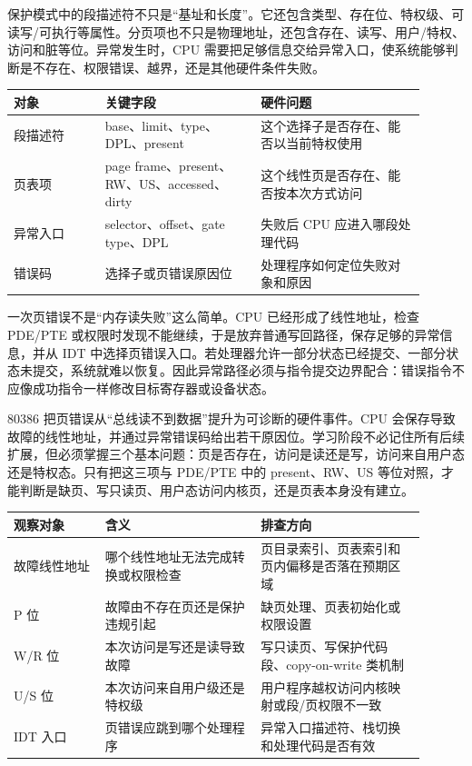 保护模式中的段描述符不只是“基址和长度”。它还包含类型、存在位、特权级、可读写/可执行等属性。分页项也不只是物理地址，还包含存在、读写、用户/特权、访问和脏等位。异常发生时，CPU 需要把足够信息交给异常入口，使系统能够判断是不存在、权限错误、越界，还是其他硬件条件失败。

\begin{longtable}{L{0.2\linewidth}L{0.34\linewidth}L{0.36\linewidth}}
\toprule
对象 & 关键字段 & 硬件问题 \\
\midrule
段描述符 & base、limit、type、DPL、present & 这个选择子是否存在、能否以当前特权使用 \\\tablerowrule
页表项 & page frame、present、RW、US、accessed、dirty & 这个线性页是否存在、能否按本次方式访问 \\\tablerowrule
异常入口 & selector、offset、gate type、DPL & 失败后 CPU 应进入哪段处理代码 \\\tablerowrule
错误码 & 选择子或页错误原因位 & 处理程序如何定位失败对象和原因 \\
\bottomrule
\end{longtable}

一次页错误不是“内存读失败”这么简单。CPU 已经形成了线性地址，检查 PDE/PTE 或权限时发现不能继续，于是放弃普通写回路径，保存足够的异常信息，并从 IDT 中选择页错误入口。若处理器允许一部分状态已经提交、一部分状态未提交，系统就难以恢复。因此异常路径必须与指令提交边界配合：错误指令不应像成功指令一样修改目标寄存器或设备状态。

80386 把页错误从“总线读不到数据”提升为可诊断的硬件事件。CPU 会保存导致故障的线性地址，并通过异常错误码给出若干原因位。学习阶段不必记住所有后续扩展，但必须掌握三个基本问题：页是否存在，访问是读还是写，访问来自用户态还是特权态。只有把这三项与 PDE/PTE 中的 present、RW、US 等位对照，才能判断是缺页、写只读页、用户态访问内核页，还是页表本身没有建立。

\begin{longtable}{L{0.2\linewidth}L{0.34\linewidth}L{0.36\linewidth}}
\toprule
观察对象 & 含义 & 排查方向 \\
\midrule
故障线性地址 & 哪个线性地址无法完成转换或权限检查 & 页目录索引、页表索引和页内偏移是否落在预期区域 \\\tablerowrule
P 位 & 故障由不存在页还是保护违规引起 & 缺页处理、页表初始化或权限设置 \\\tablerowrule
W/R 位 & 本次访问是写还是读导致故障 & 写只读页、写保护代码段、copy-on-write 类机制 \\\tablerowrule
U/S 位 & 本次访问来自用户级还是特权级 & 用户程序越权访问内核映射或段/页权限不一致 \\\tablerowrule
IDT 入口 & 页错误应跳到哪个处理程序 & 异常入口描述符、栈切换和处理代码是否有效 \\
\bottomrule
\end{longtable}

